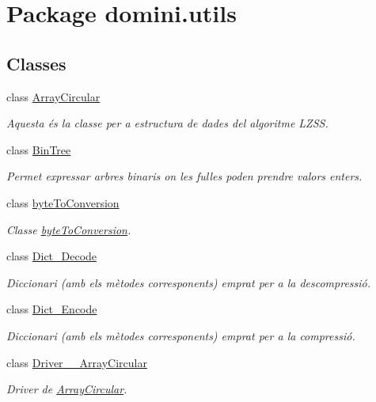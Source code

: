\hypertarget{namespacedomini_1_1utils}{}\section{Package domini.\+utils}
\label{namespacedomini_1_1utils}
\subsection*{Classes}
\begin{DoxyCompactItemize}
\item 
class \hyperlink{classdomini_1_1utils_1_1ArrayCircular}{Array\+Circular}
\begin{DoxyCompactList}\small\item\em Aquesta és la classe per a estructura de dades del algoritme L\+Z\+SS. \end{DoxyCompactList}\item 
class \hyperlink{classdomini_1_1utils_1_1BinTree}{Bin\+Tree}
\begin{DoxyCompactList}\small\item\em Permet expressar arbres binaris on les fulles poden prendre valors enters. \end{DoxyCompactList}\item 
class \hyperlink{classdomini_1_1utils_1_1byteToConversion}{byte\+To\+Conversion}
\begin{DoxyCompactList}\small\item\em Classe \hyperlink{classdomini_1_1utils_1_1byteToConversion}{byte\+To\+Conversion}. \end{DoxyCompactList}\item 
class \hyperlink{classdomini_1_1utils_1_1Dict__Decode}{Dict\+\_\+\+Decode}
\begin{DoxyCompactList}\small\item\em Diccionari (amb els mètodes corresponents) emprat per a la descompressió. \end{DoxyCompactList}\item 
class \hyperlink{classdomini_1_1utils_1_1Dict__Encode}{Dict\+\_\+\+Encode}
\begin{DoxyCompactList}\small\item\em Diccionari (amb els mètodes corresponents) emprat per a la compressió. \end{DoxyCompactList}\item 
class \hyperlink{classdomini_1_1utils_1_1Driver____ArrayCircular}{Driver\+\_\+\+\_\+\+Array\+Circular}
\begin{DoxyCompactList}\small\item\em Driver de \hyperlink{classdomini_1_1utils_1_1ArrayCircular}{Array\+Circular}. \end{DoxyCompactList}\item 

\end{DoxyCompactItemize}

